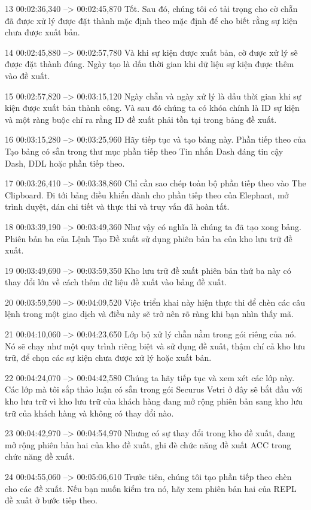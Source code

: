 13
00:02:36,340 --> 00:02:45,870
Tốt.  Sau đó, chúng tôi có tải trọng cho cờ chẵn đã được xử lý được đặt thành mặc định theo mặc định để cho biết rằng sự kiện chưa được xuất bản.

14
00:02:45,880 --> 00:02:57,780
Và khi sự kiện được xuất bản, cờ được xử lý sẽ được đặt thành đúng.  Ngày tạo là dấu thời gian khi dữ liệu sự kiện được thêm vào đề xuất.

15
00:02:57,820 --> 00:03:15,120
Ngày chẵn và ngày xử lý là dấu thời gian khi sự kiện được xuất bản thành công.  Và sau đó chúng ta có khóa chính là ID sự kiện và một ràng buộc chỉ ra rằng ID đề xuất phải tồn tại trong bảng đề xuất.

16
00:03:15,280 --> 00:03:25,960
Hãy tiếp tục và tạo bảng này.  Phần tiếp theo của Tạo bảng có sẵn trong thư mục phần tiếp theo Tin nhắn Dash đáng tin cậy Dash, DDL hoặc phần tiếp theo.

17
00:03:26,410 --> 00:03:38,860
Chỉ cần sao chép toàn bộ phần tiếp theo vào The Clipboard.  Đi tới bảng điều khiển dành cho phần tiếp theo của Elephant, mở trình duyệt, dán chi tiết và thực thi và truy vấn đã hoàn tất.

18
00:03:39,190 --> 00:03:49,360
Như vậy có nghĩa là chúng ta đã tạo xong bảng.  Phiên bản ba của Lệnh Tạo Đề xuất sử dụng phiên bản ba của kho lưu trữ đề xuất.

19
00:03:49,690 --> 00:03:59,350
Kho lưu trữ đề xuất phiên bản thứ ba này có thay đổi lớn về cách thêm dữ liệu đề xuất vào bảng đề xuất.

20
00:03:59,590 --> 00:04:09,520
Việc triển khai này hiện thực thi để chèn các câu lệnh trong một giao dịch và điều này sẽ trở nên rõ ràng khi bạn nhìn thấy mã.

21
00:04:10,060 --> 00:04:23,650
Lớp bộ xử lý chẵn nằm trong gói riêng của nó.  Nó sẽ chạy như một quy trình riêng biệt và sử dụng đề xuất, thậm chí cả kho lưu trữ, để chọn các sự kiện chưa được xử lý hoặc xuất bản.

22
00:04:24,070 --> 00:04:42,580
Chúng ta hãy tiếp tục và xem xét các lớp này.  Các lớp mà tôi sắp thảo luận có sẵn trong gói Securus Vetri ở đây sẽ bắt đầu với kho lưu trữ vì kho lưu trữ của khách hàng đang mở rộng phiên bản sang kho lưu trữ của khách hàng và không có thay đổi nào.

23
00:04:42,970 --> 00:04:54,970
Nhưng có sự thay đổi trong kho đề xuất, đang mở rộng phiên bản hai của kho đề xuất, ghi đè chức năng đề xuất ACC trong chức năng đề xuất.

24
00:04:55,060 --> 00:05:06,610
Trước tiên, chúng tôi tạo phần tiếp theo chèn cho các đề xuất.  Nếu bạn muốn kiểm tra nó, hãy xem phiên bản hai của REPL đề xuất ở bước tiếp theo.


